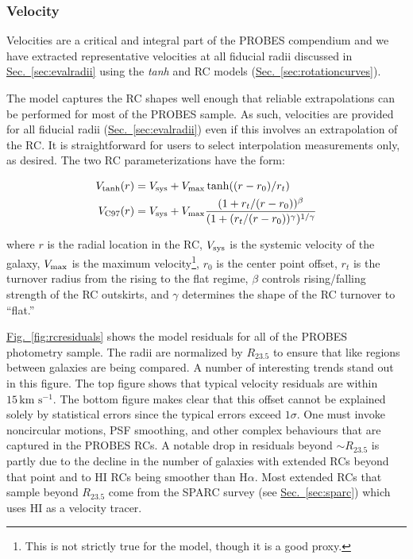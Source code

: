\documentclass[twocolumn]{aastex631}
\newcommand{\Sec}[1]{{\protect\hyperref[sec:#1]{Sec.~\ref*{sec:#1}}}}
\newcommand{\Fig}[1]{{\protect\hyperref[fig:#1]{Fig.~\ref*{fig:#1}}}}
\newcommand{\HI}{H{\footnotesize I}\xspace}
\newcommand{\Ha}{H\ensuremath{\alpha}\xspace}
\newcommand{\wunits}[2]{\ensuremath{#1\,\text{#2}}}
\begin{document}
\subsubsection{Velocity}\label{sec:evalvelocity}

Velocities are a critical and integral part of the PROBES compendium and we have extracted representative velocities at all fiducial radii discussed in \Sec{evalradii} using the \textit{tanh} and  RC models (\Sec{rotationcurves}). 

The  model captures the RC shapes well enough that reliable extrapolations can be performed for most of the PROBES sample.
As such, velocities are provided for all fiducial radii (\Sec{evalradii}) even if this involves an extrapolation of the RC.
It is straightforward for users to select interpolation measurements only, as desired. 
The two RC parameterizations have the form:

\begin{eqnarray}
        V_{\tanh}(r) &= V_{\rm sys} + V_{\rm max}\tanh((r - r_0)/r_t) \\
        V_{\rm C97}(r) &= V_{\rm sys} + V_{\rm max}\frac{(1 + r_t/(r - r_0))^{\beta}}{(1 + (r_t/(r - r_0))^{\gamma})^{1/\gamma}}
\end{eqnarray}

where $r$ is the radial location in the RC, $V_{\rm sys}$ is the systemic velocity of the 
galaxy, $V_{\rm max}$ is the maximum velocity\footnote{This is not strictly true for the  model, though it is a good proxy.}, $r_0$ is the center point offset, $r_t$ is the turnover radius from the rising to the flat regime, $\beta$ controls rising/falling strength of the RC outskirts, and $\gamma$ determines the shape of the RC turnover to ``flat.''

\Fig{rcresiduals} shows the  model residuals for all of the PROBES photometry sample.
The radii are normalized by $R_{23.5}$ to ensure that like regions between galaxies are being compared.
A number of interesting trends stand out in this figure.
The top figure shows that typical velocity residuals are within \wunits{15}{km s$^{-1}$}. 
The bottom figure makes clear that this offset cannot be explained solely by statistical errors since the typical errors exceed $1\sigma$. 
One must invoke noncircular motions, PSF smoothing, and other complex behaviours that are captured in the PROBES RCs.
A notable drop in residuals beyond $\sim R_{23.5}$ is partly due to the decline in the number of galaxies with extended RCs beyond that point and to \HI RCs being smoother than \Ha.
Most extended RCs that sample beyond $R_{23.5}$ come from the SPARC survey (see \Sec{sparc}) which uses \HI as a velocity tracer.
\end{document}
